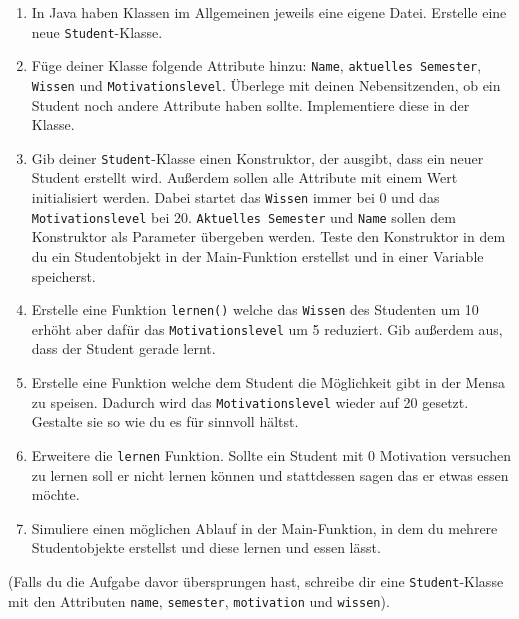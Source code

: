 \documentclass{../../sheet}
\begin{document}
\begin{enumerate}
    \item In Java haben Klassen im Allgemeinen jeweils eine eigene Datei. Erstelle eine neue \texttt{Student}-Klasse. 
    \item Füge deiner Klasse folgende Attribute hinzu: \texttt{Name}, \texttt{aktuelles Semester}, \texttt{Wissen} \newline und \texttt{Motivationslevel}. Überlege mit deinen Nebensitzenden, ob ein Student noch andere Attribute haben sollte. Implementiere diese in der Klasse.
    \item Gib deiner \texttt{Student}-Klasse einen Konstruktor, der ausgibt, dass ein neuer Student erstellt wird. Außerdem sollen alle Attribute mit einem Wert initialisiert werden. Dabei startet das \texttt{Wissen} immer bei 0 und das \texttt{Motivationslevel} bei 20. \texttt{Aktuelles Semester} und \texttt{Name} sollen dem Konstruktor als Parameter übergeben werden. Teste den Konstruktor in dem du ein Studentobjekt in der Main-Funktion erstellst und in einer Variable speicherst.
    \item Erstelle eine Funktion \texttt{lernen()} welche das \texttt{Wissen} des Studenten um 10 erhöht aber dafür das \texttt{Motivationslevel} um 5 reduziert. Gib außerdem aus, dass der Student gerade lernt.
    \item Erstelle eine Funktion welche dem Student die Möglichkeit gibt in der Mensa zu speisen. Dadurch wird das \texttt{Motivationslevel} wieder auf 20 gesetzt. Gestalte sie so wie du es für sinnvoll hältst. 
    \item Erweitere die \texttt{lernen} Funktion. Sollte ein Student mit 0 Motivation versuchen zu lernen soll er nicht lernen können und stattdessen sagen das er etwas essen möchte.
    \item Simuliere einen möglichen Ablauf in der Main-Funktion, in dem du mehrere Studentobjekte erstellst und diese lernen und essen lässt.
\end{enumerate}

\newpage
{}
(Falls du die Aufgabe davor übersprungen hast, schreibe dir  eine \texttt{Student}-Klasse mit den Attributen \texttt{name}, \texttt{semester}, \texttt{motivation} und \texttt{wissen}).
\end{document}

